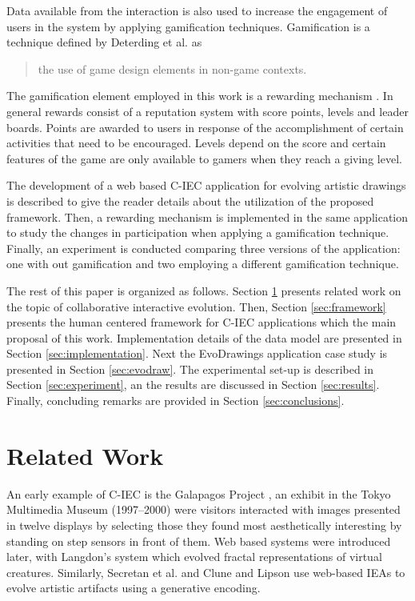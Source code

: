 Data available from the interaction is also used to increase the engagement of 
users in the system by applying  gamification techniques. Gamification
is a technique defined by 
Deterding et al. \cite{deterding2011game} as
\begin{quote}
  the use of game design elements in non-game contexts.
\end{quote}  
The gamification element employed in this work is a rewarding mechanism  
\cite{dubois2013understanding}. In general rewards  consist of a reputation system 
with score points, levels and leader boards. Points are awarded to users in response of 
the accomplishment of certain activities that need to be encouraged. Levels depend
on the score and certain features of the game are only available to gamers when 
they reach a giving level. 

The development of a web based C-IEC application 
for evolving artistic drawings is described to give the reader details about 
the utilization of the proposed framework. Then, a rewarding mechanism is 
implemented in the same application to study the changes in participation
when applying a gamification technique. Finally, an experiment is conducted
comparing three versions of the application: one with out gamification and
two employing a different gamification technique.

The rest of this paper is organized as follows.
Section \ref{sec:related} presents related work on the topic 
of collaborative interactive evolution. Then, Section \ref{sec:framework} 
presents the human centered framework
for C-IEC applications which the main proposal of this work. Implementation details of the data model
are presented in Section \ref{sec:implementation}. 
Next the EvoDrawings application case study is presented in
Section \ref{sec:evodraw}. The experimental set-up is described in Section \ref{sec:experiment},
an the results are discussed in Section \ref{sec:results}. Finally, concluding remarks are provided 
in Section \ref{sec:conclusions}.

\section{Related Work}
\label{sec:related}

An early example of C-IEC is the Galapagos Project \cite{sims1997interactivity},
an exhibit in the Tokyo Multimedia Museum (1997--2000) 
were visitors interacted with images presented in 
twelve displays by selecting those they found most aesthetically interesting by standing on
step sensors in front of them. Web based systems were introduced later, with  
Langdon's system \cite{langdon:2004} which evolved fractal representations of virtual creatures. 
Similarly, Secretan et al. \cite{picbreeder} and Clune and Lipson \cite{forms} 
use web-based IEAs to evolve artistic artifacts using a generative encoding.

